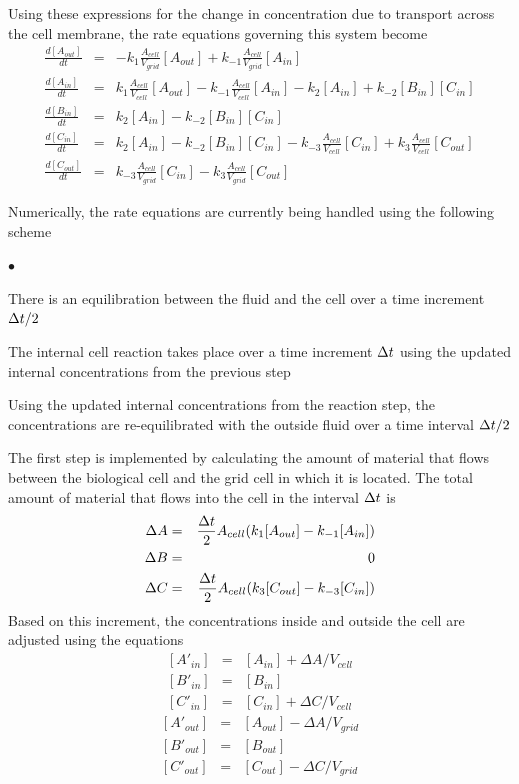 \documentclass[12pt]{article}
\begin{document}
Using these expressions for the change in concentration due to transport across the cell membrane, the
rate equations governing this system become
\begin{eqnarray*}
\frac{d [A_{out}]}{d t} &=&-k_1\frac{A_{cell}}{V_{grid}} [A_{out}]
+k_{-1}\frac{A_{cell}}{V_{grid}} [A_{in}] \\
\frac{d [A_{in}]}{d t} &=&k_1\frac{A_{cell}}{V_{cell}} [A_{out}]
-k_{-1}\frac{A_{cell}}{V_{cell}} [A_{in}] - k_2 [A_{in}]
 + k_{-2}[B_{in}][C_{in}]\\
\frac{d [B_{in}]}{d t} &=&k_2 [A_{in}] - k_{-2}[B_{in}][C_{in}]\\
\frac{d [C_{in}]}{d t} &=&k_2 [A_{in}] - k_{-2}[B_{in}][C_{in}]
-k_{-3} \frac{A_{cell}}{V_{cell}}[C_{in}]
+ k_3\frac{A_{cell}}{V_{cell}} [C_{out}] \\
\frac{d [C_{out}]}{d t} &=&k_{-3} \frac{A_{cell}}{V_{grid}}[C_{in}]
-k_3\frac{A_{cell}}{V_{grid}} [C_{out}]
\end{eqnarray*}

Numerically, the rate equations are currently being handled using the following scheme
\begin{list}{$\bullet$}{}
\item There is an equilibration between the fluid and the cell over a time
increment $\Delta t/2$
\item The internal cell reaction takes place over a time increment $\Delta t$
using the updated internal concentrations from the previous step
\item Using the updated internal concentrations from the reaction step, the
concentrations are re-equilibrated with the outside fluid over a time interval
$\Delta t/2$
\end{list}
The first step is implemented by calculating the amount of material that flows
between the biological cell and the grid cell in which it is located.
The total amount of
material that flows into the cell in the interval $\Delta t$ is
\begin{eqnarray*}
\Delta A & = & \frac{\Delta t}{2} A_{cell}(k_1 [A_{out}]-k_{-1} [A_{in}]) \\
\Delta B & = & 0 \\
\Delta C & = & \frac{\Delta t}{2} A_{cell}(k_3 [C_{out}]-k_{-3} [C_{in}]) \\
\end{eqnarray*}
Based on this increment, the concentrations inside and outside the cell are
adjusted using the equations
\begin{eqnarray}
\nonumber
[A'_{in}] &=& [A_{in}] + \Delta A/V_{cell} \\
\nonumber
[B'_{in}]  &=& [B_{in}] \\
\nonumber
[C'_{in}] &=& [C_{in}] + \Delta C/V_{cell}
\end{eqnarray}
\begin{eqnarray}
\nonumber
[A'_{out}] &=& [A_{out}] - \Delta A/V_{grid} \\
\nonumber
[B'_{out}]  & = & [B_{out}] \\
\nonumber
[C'_{out}] &=& [C_{out}] - \Delta C/V_{grid}
\end{eqnarray}
\end{document}
